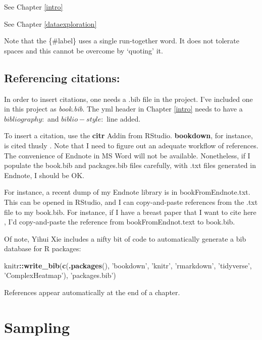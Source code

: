 \documentclass[]{book}
\newenvironment{Shaded}{\begin{snugshade}}{\end{snugshade}}
\newcommand{\KeywordTok}[1]{\textcolor[rgb]{0.13,0.29,0.53}{\textbf{#1}}}
\newcommand{\NormalTok}[1]{#1}
\newcommand{\OperatorTok}[1]{\textcolor[rgb]{0.81,0.36,0.00}{\textbf{#1}}}
\newcommand{\StringTok}[1]{\textcolor[rgb]{0.31,0.60,0.02}{#1}}
\begin{document}
See Chapter \ref{intro}

See Chapter \ref{dataexploration}

Note that the \{\#label\} uses a single run-together word. It does not tolerate spaces and this cannot be overcome by `quoting' it.

\hypertarget{referencing-citations}{%
\section{Referencing citations:}\label{referencing-citations}}

In order to insert citations, one needs a .bib file in the project. I've included one in this project as \emph{book.bib}. The yml header in Chapter \ref{intro} needs to have a \(bibliography:\) and \(biblio-style:\) line added.

To insert a citation, use the \textbf{citr} Addin from RStudio. \textbf{bookdown}, for instance, is cited thusly \citep{R-bookdown}. Note that I need to figure out an adequate workflow of references. The convenience of Endnote in MS Word will not be available. Nonetheless, if I populate the book.bib and packages.bib files carefully, with .txt files generated in Endnote, I should be OK.

For instance, a recent dump of my Endnote library is in bookFromEndnote.txt. This can be opened in RStudio, and I can copy-and-paste references from the .txt file to my book.bib. For instance, if I have a breast paper that I want to cite here \citep{RN2750}, I'd copy-and-paste the reference from bookFromEndnot.text to book.bib.

Of note, Yihui Xie includes a nifty bit of code to automatically generate a bib database for R packages:

\begin{Shaded}
\begin{Highlighting}[]
\NormalTok{knitr}\OperatorTok{::}\KeywordTok{write_bib}\NormalTok{(}\KeywordTok{c}\NormalTok{(}\KeywordTok{.packages}\NormalTok{(), }\StringTok{'bookdown'}\NormalTok{, }\StringTok{'knitr'}\NormalTok{, }\StringTok{'rmarkdown'}\NormalTok{, }\StringTok{'tidyverse'}\NormalTok{, }\StringTok{'ComplexHeatmap'}\NormalTok{), }\StringTok{'packages.bib'}\NormalTok{)}
\end{Highlighting}
\end{Shaded}

References appear automatically at the end of a chapter.

\hypertarget{sampling}{%
\chapter{Sampling}\label{sampling}}
\end{document}
